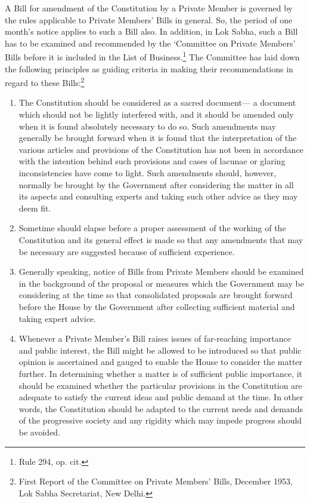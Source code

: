 \begin{multicols}{2}
\noi
A Bill for amendment of the Constitution by a Private Member is governed by the rules
applicable to Private Members’ Bills in general. So, the period of one month’s notice applies
to such a Bill also. In addition, in Lok Sabha, such a Bill has to be examined and recommended
by the ‘Committee on Private Members’ Bills before it is included in the List of Business.\footnote{Rule 294, op. cit.}
The Committee has laid down the following principles as guiding criteria in making their
recommendations in regard to these Bills:\footnote{First Report of the Committee on Private Members’ Bills, December 1953, Lok Sabha Secretariat, New Delhi.}

\begin{enumerate}
\item The Constitution should be considered as a sacred document— a document which should
not be lightly interfered with, and it should be amended only when it is found absolutely
necessary to do so. Such amendments may generally be brought forward when it is found that
the interpretation of the various articles and provisions of the Constitution has not been in
accordance with the intention behind such provisions and cases of lacunae or glaring inconsistencies have come to light. Such amendments should, however, normally be brought
by the Government after considering the matter in all its aspects and consulting experts and
taking such other advice as they may deem fit.

\item Sometime should elapse before a proper assessment of the working of the Constitution and
its general effect is made so that any amendments that may be necessary are suggested because
of sufficient experience.

\item Generally speaking, notice of Bills from Private Members should be examined in the
background of the proposal or measures which the Government may be considering at the
time so that consolidated proposals are brought forward before the House by the Government
after collecting sufficient material and taking expert advice.

\item Whenever a Private Member’s Bill raises issues of far-reaching importance and public
interest, the Bill might be allowed to be introduced so that public opinion is ascertained and
gauged to enable the House to consider the matter further. In determining whether a matter is
of sufficient public importance, it should be examined whether the particular provisions in the
Constitution are adequate to satisfy the current ideas and public demand at the time. In other
words, the Constitution should be adapted to the current needs and demands of the progressive
society and any rigidity which may impede progress should be avoided.
\end{enumerate}


\end{multicols}

